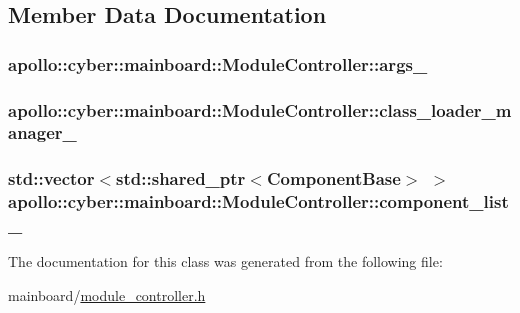 \subsection{Member Data Documentation}
\hypertarget{classapollo_1_1cyber_1_1mainboard_1_1ModuleController_a59f9d35eda721b8cbc53e3cb3a1f0bc4}{
\subsubsection[{args\-\_\-}]{ apollo\-::cyber\-::mainboard\-::\-Module\-Controller\-::args\-\_\-\hspace{0.3cm}{\ttfamily [private]}}}\label{classapollo_1_1cyber_1_1mainboard_1_1ModuleController_a59f9d35eda721b8cbc53e3cb3a1f0bc4}
\hypertarget{classapollo_1_1cyber_1_1mainboard_1_1ModuleController_a2bb220ce165f65bb2caa18ee2bfacb06}{
\subsubsection[{class\-\_\-loader\-\_\-manager\-\_\-}]{ apollo\-::cyber\-::mainboard\-::\-Module\-Controller\-::class\-\_\-loader\-\_\-manager\-\_\-\hspace{0.3cm}{\ttfamily [private]}}}\label{classapollo_1_1cyber_1_1mainboard_1_1ModuleController_a2bb220ce165f65bb2caa18ee2bfacb06}
\hypertarget{classapollo_1_1cyber_1_1mainboard_1_1ModuleController_a65e6f89c1acc8ba2509ed81ebe8e8b69}{
\subsubsection[{component\-\_\-list\-\_\-}]{\setlength{\rightskip}{0pt plus 5cm}std\-::vector$<$std\-::shared\-\_\-ptr$<${\bf Component\-Base}$>$ $>$ apollo\-::cyber\-::mainboard\-::\-Module\-Controller\-::component\-\_\-list\-\_\-\hspace{0.3cm}{\ttfamily [private]}}}\label{classapollo_1_1cyber_1_1mainboard_1_1ModuleController_a65e6f89c1acc8ba2509ed81ebe8e8b69}


The documentation for this class was generated from the following file\-:\begin{DoxyCompactItemize}
\item 
mainboard/\hyperlink{module__controller_8h}{module\-\_\-controller.\-h}\end{DoxyCompactItemize}
